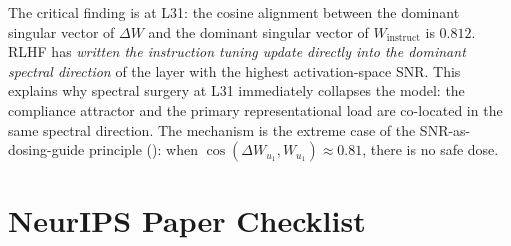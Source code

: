 \documentclass{article}
\begin{document}
The critical finding is at L31: the cosine alignment between the dominant
singular vector of $\Delta W$ and the dominant singular vector of
$W_\mathrm{instruct}$ is $0.812$. RLHF has \emph{written the instruction
tuning update directly into the dominant spectral direction} of the
layer with the highest activation-space SNR. This explains why spectral
surgery at L31 immediately collapses the model: the compliance attractor
and the primary representational load are co-located in the same spectral
direction. The mechanism is the extreme case of the SNR-as-dosing-guide
principle (): when $\cos(\Delta W_{u_1},
W_{u_1}) \approx 0.81$, there is no safe dose.

\section*{NeurIPS Paper Checklist}
\end{document}
